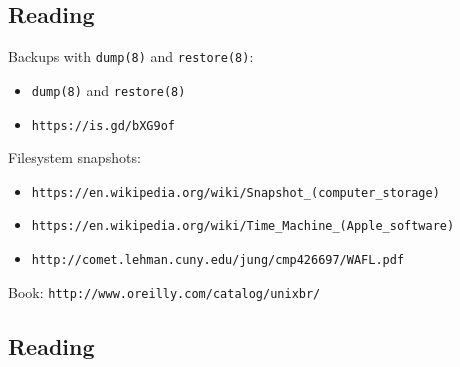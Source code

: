 \documentclass[xga]{xdvislides}
\begin{document}
\subsection{Reading}
Backups with {\tt dump(8)} and {\tt restore(8)}:
\begin{itemize}
	\item \verb+dump(8)+ and \verb+restore(8)+
	\item \verb+https://is.gd/bXG9of+
\end{itemize}
\vspace{.5in}

Filesystem snapshots:
\begin{itemize}
	\item \verb+https://en.wikipedia.org/wiki/Snapshot_(computer_storage)+
	\item \verb+https://en.wikipedia.org/wiki/Time_Machine_(Apple_software)+
	\item \verb+http://comet.lehman.cuny.edu/jung/cmp426697/WAFL.pdf+
\end{itemize}
\vspace{.5in}
Book: \verb+http://www.oreilly.com/catalog/unixbr/+



\subsection{Reading}

\end{document}

